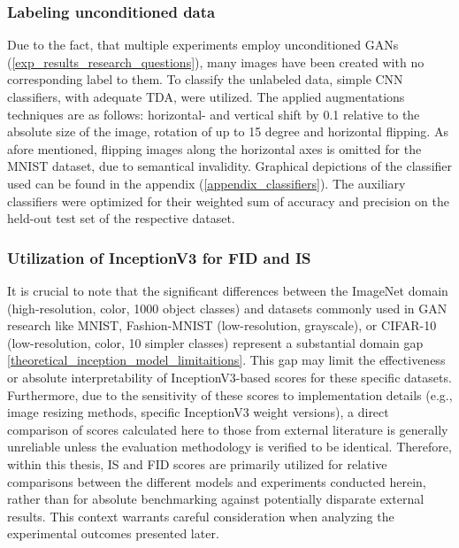 \subsubsection{Labeling unconditioned data}\label{body_experiment_labeling_data}
Due to the fact, that multiple experiments employ unconditioned GANs (\ref{exp_results_research_questions}), many images have been created with no corresponding label to them. To classify the unlabeled data, simple CNN classifiers, with adequate TDA, were utilized. The applied augmentations techniques are as follows: horizontal- and vertical shift by 0.1 relative to the absolute size of the image, rotation of up to 15 degree and horizontal flipping. As afore mentioned, flipping images along the horizontal axes is omitted for the MNIST dataset, due to semantical invalidity. Graphical depictions of the classifier used can be found in the appendix (\ref{appendix_classifiers}). The auxiliary classifiers were optimized for their weighted sum of accuracy and precision on the held-out test set of the respective dataset.\\


\subsubsection{Utilization of InceptionV3 for FID and IS}\label{body_experiment_inception_model}
It is crucial to note that the significant differences between the ImageNet domain (high-resolution, color, 1000 object classes) and datasets commonly used in GAN research like MNIST, Fashion-MNIST (low-resolution, grayscale), or CIFAR-10 (low-resolution, color, 10 simpler classes) represent a substantial domain gap \ref{theoretical_inception_model_limitaitions}. This gap may limit the effectiveness or absolute interpretability of InceptionV3-based scores for these specific datasets. Furthermore, due to the sensitivity of these scores to implementation details (e.g., image resizing methods, specific InceptionV3 weight versions), a direct comparison of scores calculated here to those from external literature is generally unreliable unless the evaluation methodology is verified to be identical. Therefore, within this thesis, IS and FID scores are primarily utilized for relative comparisons between the different models and experiments conducted herein, rather than for absolute benchmarking against potentially disparate external results. This context warrants careful consideration when analyzing the experimental outcomes presented later.


